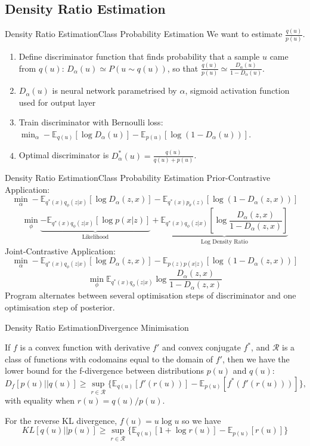 \documentclass{beamer}
\begin{document}
\subsection{Density Ratio Estimation}

\begin{frame}{Density Ratio Estimation}{Class Probability Estimation}
We want to estimate $\frac{q(u)}{p(u)}$.
  \begin{enumerate}
  \item {
    Define discriminator function that finds probability that a sample $u$ came from $q(u)$: $D_\alpha(u)\simeq P(u\sim q(u))$, so that $\frac{q(u)}{p(u)}\simeq \frac{D_\alpha(u)}{1-D_\alpha(u)}$.
  }
  \item $D_\alpha(u)$ is neural network parametrised by $\alpha$, sigmoid activation function used for output layer
  \item {
    Train discriminator with Bernoulli loss: $\min_\alpha -\mathbb{E}_{q(u)}[\log D_\alpha(u)]-\mathbb{E}_{p(u)}[\log(1-D_\alpha(u))]$.
  }
  \item Optimal discriminator is $D^*_\alpha(u)=\frac{q(u)}{q(u)+p(u)}$.
  \end{enumerate}
\end{frame}
\begin{frame}{Density Ratio Estimation}{Class Probability Estimation}
Prior-Contrastive Application:
\[\min_\alpha -\mathbb{E}_{q^*(x)q_\phi(z|x)}[\log D_\alpha(z,x)]-\mathbb{E}_{q^*(x)p_\theta(z)}[\log (1-D_\alpha(z,x))]\]
\[\min_\phi \underbrace{-\mathbb{E}_{q^*(x)q_\phi(z|x)}[\log p(x|z)]}_\text{Likelihood}+\underbrace{\mathbb{E}_{q^*(x)q_\phi(z|x)}\left[\log \frac{D_\alpha(z,x)}{1-D_\alpha(z,x)}\right]}_\text{Log Density Ratio}\]
Joint-Contrastive Application:
\[\min_\alpha -\mathbb{E}_{q^*(x)q_\phi(z|x)}[\log D_\alpha(z,x)]-\mathbb{E}_{p(z)p(x|z)}[\log (1-D_\alpha(z,x))]\]
\[\min_\phi \mathbb{E}_{q^*(x)q_\phi(z|x)}\log\frac{D_\alpha(z,x)}{1-D_\alpha(z,x)}\]
Program alternates between several optimisation steps of discriminator and one optimisation step of posterior.
\end{frame}
\begin{frame}{Density Ratio Estimation}{Divergence Minimisation}
\begin{theorem}
If $f$ is a convex function with derivative $f'$ and convex conjugate $f^*$, and $\mathcal{R}$ is a class of functions with codomains equal to the domain of $f'$, then we have the lower bound for the f-divergence between distributions $p(u)$ and $q(u)$:
\[D_f [p(u)||q(u)]\geq \sup_{r\in \mathcal{R}} \{\mathbb{E}_{q(u)}[f'(r(u))]-\mathbb{E}_{p(u)}[f^*(f'(r(u)))]\},\]
with equality when $r(u)=q(u)/p(u)$.
\end{theorem}
For the reverse KL divergence, $f(u)=u\log u$ so we have
\[KL[q(u)||p(u)]\geq \sup_{r\in \mathcal{R}}\{\mathbb{E}_{q(u)}[1+\log r(u)]-\mathbb{E}_{p(u)}[r(u)]\}\]

\end{frame}
\end{document}
